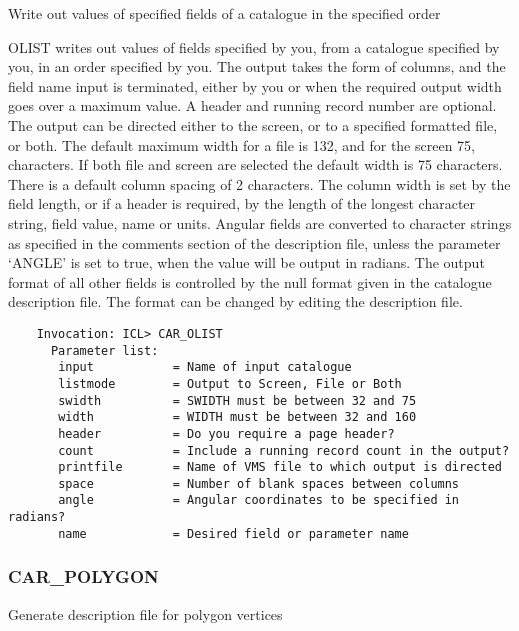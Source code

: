 Write out values of specified fields of a catalogue in the specified 
order

OLIST writes out values of fields specified by you, from a
catalogue specified by you, in an order specified by you.  
The output takes the form of columns, and the field name input is 
terminated, either by you or when the required output width goes 
over a maximum value.  
A header and running record number are optional.
The output can be directed either to the screen, or to a specified
formatted file, or both.  
The default maximum width for a file is 132, and for the screen 75, 
characters.  
If both file and screen are selected the default width is 75 characters.  
There is a default column spacing of 2 characters.  
The column width is set by the field length, or if a header is required, 
by the length of the longest character string, field value, name or units.
Angular fields are converted to character strings as specified in
the comments section of the description file, unless the parameter
`ANGLE' is set to true, when the value will be output in radians.
The output format of all other fields is controlled by the null
format given in the catalogue description file.  The format can be
changed by editing the description file.
\begin{verbatim}
    Invocation: ICL> CAR_OLIST
      Parameter list:
       input           = Name of input catalogue
       listmode        = Output to Screen, File or Both
       swidth          = SWIDTH must be between 32 and 75
       width           = WIDTH must be between 32 and 160
       header          = Do you require a page header?
       count           = Include a running record count in the output?
       printfile       = Name of VMS file to which output is directed
       space           = Number of blank spaces between columns
       angle           = Angular coordinates to be specified in radians?
       name            = Desired field or parameter name
\end{verbatim}

\subsubsection{CAR\_POLYGON}

Generate description file for polygon vertices

